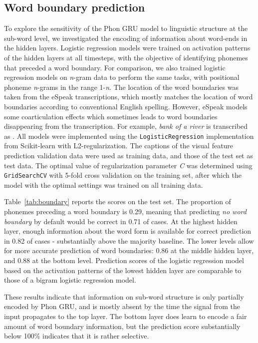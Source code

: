 
\subsection{Word boundary prediction}
To explore the sensitivity of the {\sc Phon GRU} model to linguistic structure at the sub-word level, we investigated the encoding of information about word-ends in the hidden layers. Logistic regression models were trained on activation patterns of the hidden layers at all timesteps, with the objective of identifying phonemes that preceded a word boundary. For comparison, we also trained logistic regression models on \textit{n}-gram data to perform the same tasks, with positional phoneme \textit{n}-grams in the range 1-\textit{n}. The location of the word boundaries was taken from the eSpeak transcriptions, which mostly matches the location of word boundaries according to conventional English spelling. However, eSpeak models some coarticulation effects which sometimes leads to word boundaries disappearing from the transcription. For example, {\it bank of a river} is transcribed as .
All models were implemented using the {\tt LogisticRegression} implementation from Scikit-learn \cite{scikit-learn} with L2-regularization. The captions of the visual feature prediction validation data were used as training data, and those of the test set as test data. The optimal value of regularization parameter \textit{C} was determined using {\tt GridSearchCV} with 5-fold cross validation on the training set, after which the model with the optimal settings was trained on all training data.

Table~\ref{tab:boundary} reports the scores on the test set. The proportion of phonemes preceding a word boundary is 0.29, meaning that predicting {\it no word boundary} by default would be correct in 0.71 of cases. At the highest hidden layer, enough information about the word form is available for correct prediction in 0.82 of cases - substantially above the majority baseline. The lower levels allow for more accurate prediction of word boundaries: 0.86 at the middle hidden layer, and 0.88 at the bottom level.
Prediction scores of the logistic regression model based on the activation patterns of the lowest hidden layer are comparable to those of a bigram logistic regression model.

These results indicate that information on sub-word structure is only partially encoded by {\sc Phon GRU}, and is mostly absent by the time the signal from the input propagates to the top layer. The bottom layer does learn to encode a fair amount of word boundary information, but the prediction score substantially below 100\% indicates that it is rather selective. 

